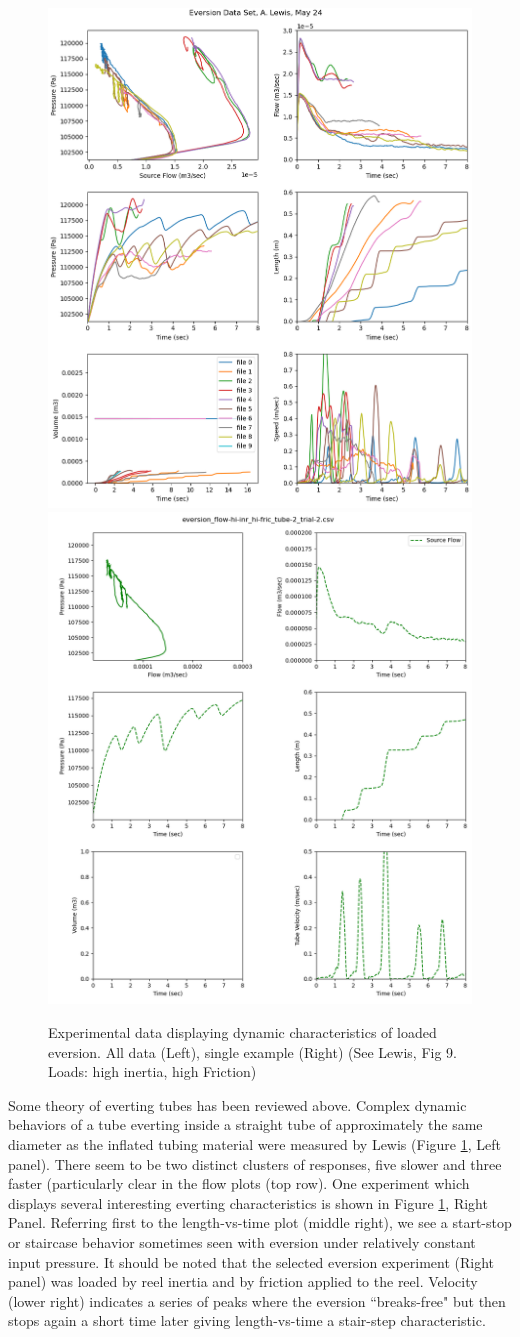 \documentclass[letterpaper]{article}
\begin{document}
\begin{figure}[h]\centering
\includegraphics[width=.475\textwidth]{ExpDataExampleAll.png}
\includegraphics[width=.475\textwidth]{ExpDataExample.png}
\caption{Experimental data displaying dynamic characteristics of loaded eversion.  All data (Left), single example (Right) (See Lewis, Fig 9. Loads: high inertia, high Friction)}
\label{Fig:experData}
\end{figure}

Some theory of everting tubes has been reviewed above.   Complex dynamic behaviors of a tube everting
inside
a straight tube of approximately the same diameter as the inflated tubing material were measured
by Lewis \cite{xxxx} (Figure \ref{Fig:experData}, Left panel).
There seem to be two distinct clusters of responses, five slower and three faster (particularly clear
in the flow plots (top row).
One experiment which displays several interesting everting characteristics
is shown in Figure \ref{Fig:experData}, Right Panel.
Referring first to the length-vs-time plot (middle right), we see a start-stop or staircase
behavior sometimes seen with eversion under relatively constant input pressure.   It
should be noted that the selected eversion experiment (Right panel) was loaded by reel inertia and
by friction applied to the reel.  Velocity (lower right) indicates a series of peaks where the eversion
``breaks-free" but then stops again a short time later giving length-vs-time a stair-step characteristic.
\end{document}
